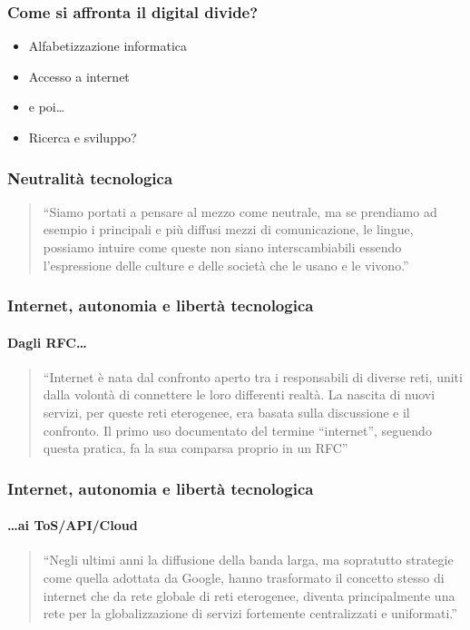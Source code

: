 \documentclass{beamer}
\begin{document}
\begin{frame}

  \frametitle{Come si affronta il digital divide?}
  \begin{itemize}
    \item Alfabetizzazione informatica
    \item Accesso a internet
    \item e poi\ldots
    \item Ricerca e sviluppo?
    \end{itemize}

 \end{frame}

\begin{frame}

  \frametitle{Neutralità tecnologica}

  \begin{quote}
    ``Siamo portati a pensare al mezzo come neutrale, ma se prendiamo
    ad esempio i principali e più diffusi mezzi di comunicazione, le
    lingue, possiamo intuire come queste non siano interscambiabili
    essendo l'espressione delle culture e delle società che le usano e
    le vivono.''
  \end{quote}
  
\end{frame}


\begin{frame}
  \frametitle{Internet, autonomia e libertà tecnologica}
  \framesubtitle{Dagli RFC\ldots}
  \begin{quote}
  ``Internet è nata dal confronto aperto tra i responsabili di diverse
  reti, uniti dalla volontà di connettere le loro differenti
  realtà. La nascita di nuovi servizi, per queste reti eterogenee, era
  basata sulla discussione e il confronto. Il primo uso documentato
  del termine ``internet'', seguendo questa pratica, fa la sua
  comparsa proprio in un RFC'' 
\end{quote}

\end{frame}

\begin{frame}
  \frametitle{Internet, autonomia e libertà tecnologica}
  \framesubtitle{\ldots ai ToS/API/Cloud}
  \begin{quote}
  ``Negli ultimi anni la diffusione della banda larga, ma sopratutto
  strategie come quella adottata da Google, hanno  trasformato il 
  concetto stesso di internet che da rete globale di reti eterogenee,
  diventa principalmente una rete per la globalizzazione di servizi
  fortemente centralizzati e uniformati.'' 
  \end{quote}
\end{frame}
\end{document}
